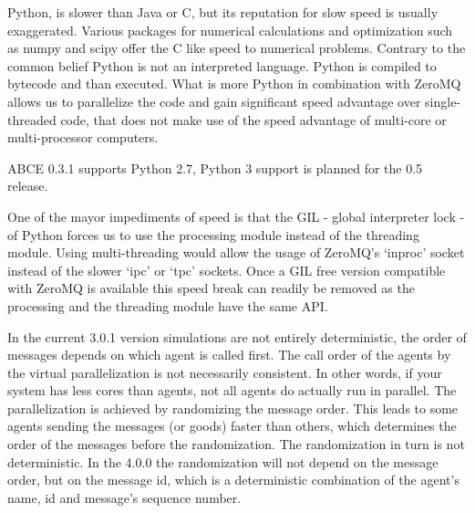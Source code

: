 \documentclass[letterpaper,10pt,english]{sphinxmanual}
\begin{document}
Python, is slower than Java or C, but its reputation for slow speed is usually
exaggerated. Various packages for numerical calculations and optimization such as numpy and scipy offer
the C like speed to numerical problems. Contrary to the common belief
Python is not an interpreted language. Python is compiled to bytecode and
than executed. What is more Python in combination with ZeroMQ allows us
to parallelize the code and gain significant speed advantage over
single-threaded code, that does not make use of the speed advantage of
multi-core or multi-processor computers.

ABCE 0.3.1 supports Python 2.7, Python 3 support is planned for
the 0.5 release.

One of the mayor impediments of speed is that the GIL - global interpreter lock -
of Python forces us to use the processing module instead of the threading module.
Using multi-threading would allow the usage of ZeroMQ's  `inproc' socket instead of the
slower `ipc' or `tpc' sockets. Once a GIL free version compatible with ZeroMQ is
available this speed break can readily be removed as the processing and the threading
module have the same API.

In the current 3.0.1 version simulations are not entirely deterministic,
the order of messages depends on which agent is called first. The call
order of the agents by the virtual parallelization is not necessarily
consistent. In other words, if your system has less cores than agents,
not all agents do actually run in parallel. The parallelization is achieved
by randomizing the message order. This leads to some agents sending the
messages (or goods) faster than others, which determines the order of
the messages before the randomization. The randomization in turn is not
deterministic. In the 4.0.0 the randomization will not depend on the
message order, but on the message id, which is a deterministic
combination of the agent's name, id and message’s sequence number.
\end{document}
